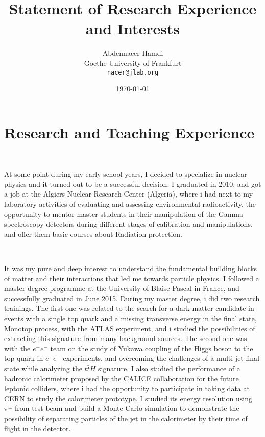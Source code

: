 \documentclass[a4paper,roman]{article}
\title{Statement of Research Experience and Interests}
\author{Abdennacer Hamdi\\
Goethe University of Frankfurt\\
\texttt{nacer@jlab.org}}
\date{\today}
\begin{document}
\fontsize{12}{15}
\selectfont
\maketitle

\section*{Research and Teaching Experience}
~\par At some point during my early school years, I decided to specialize in nuclear physics and it turned out to be a successful decision. I graduated in 2010, and got a job at the Algiers Nuclear Research Center (Algeria), where i had next to my laboratory activities of evaluating and assessing environmental radioactivity, the opportunity to mentor master students in their manipulation of the Gamma spectroscopy detectors during different stages of calibration and manipulations, and offer them basic courses about Radiation protection.

~\par It was my pure and deep interest to understand the fundamental building blocks of matter and their interactions that led me towards particle physics. I followed a master degree programme at the University of Blaise Pascal in France, and successfully graduated in June 2015. During my master degree, i did two research trainings. The first one was related to the search for a dark matter candidate in events with a single top quark and a missing transverse energy in the final state, Monotop process, with the ATLAS experiment, and i studied the possibilities of extracting this signature from many background sources. The second one was with the $e^+e^-$ team on the study of Yukawa coupling of the Higgs boson to the top quark in $e^+e^-$ experiments, and overcoming the challenges of a multi-jet final state while analyzing the $t\bar{t}H$ signature. I also studied the performance of a hadronic calorimeter proposed by the CALICE collaboration for the future leptonic colliders, where i had the opportunity to participate in taking data at CERN to study the calorimeter prototype. I studied its energy resolution using $\pi^{\pm}$ from test beam and build a Monte Carlo simulation to demonstrate the possibility of separating particles of the jet in the calorimeter by their time of flight in the detector.
\end{document}
